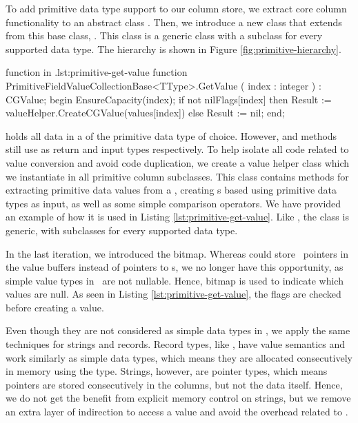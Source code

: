 To add primitive data type support to our column store, we extract core column functionality to an abstract class . Then, we introduce a new class that extends from this base class, . This class is a generic class with a subclass for every supported data type. The hierarchy is shown in Figure \ref{fig:primitive-hierarchy}.

\begin{delphicode}{ function in .}{lst:primitive-get-value}
function PrimitiveFieldValueCollectionBase<TType>.GetValue
( index : integer )
: CGValue;
begin
  EnsureCapacity(index);
  if not nilFlags[index] then
    Result := valueHelper.CreateCGValue(values[index])
  else
    Result := nil;
end;
\end{delphicode}

 holds all data in a  of the primitive data type of choice. However,  and  methods still use  as return and input types respectively. To help isolate all code related to value conversion and avoid code duplication, we create a value helper class which we instantiate in all primitive column subclasses. This class contains methods for extracting primitive data values from a , creating s based using primitive data types as input, as well as some simple comparison operators. We have provided an example of how it is used in Listing \ref{lst:primitive-get-value}. Like , the class is generic, with subclasses for every supported data type.

In the last iteration, we introduced the  bitmap. Whereas  could store \null~pointers in the value buffers instead of pointers to s, we no longer have this opportunity, as simple value types in \delphi~are not nullable. Hence,  bitmap is used to indicate which values are null. As seen in Listing \ref{lst:primitive-get-value}, the flags are checked before creating a value.

Even though they are not considered as simple data types in \delphi, we apply the same techniques for strings and records. Record types, like , have value semantics and work similarly as simple data types, which means they are allocated consecutively in memory using the  type. Strings, however, are pointer types, which means pointers are stored consecutively in the columns, but not the data itself. Hence, we do not get the benefit from explicit memory control on strings, but we remove an extra layer of indirection to access a value and avoid the overhead related to .

